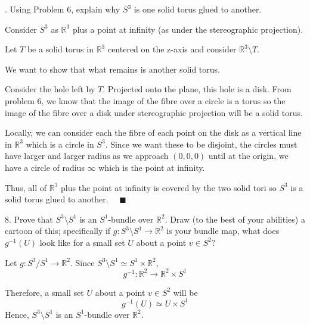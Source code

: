 \documentclass[12pt]{article}
\newcommand{\R}{\mathbb{R}}
\newcommand{\lra}{\longrightarrow}
\newcommand{\qed}{\quad \blacksquare}
\begin{document}
    \color{black}

.  Using Problem 6, explain why $S^{3}$ is one solid torus glued to another. 

    \color{blue}
        Consider $S^3$ as $\R^3$ plus a point at infinity (as under the stereographic projection). 

        Let $T$ be a solid torus in $\R^3$ centered on the z-axis and consider $\R^3 \setminus T$. 

        We want to show that what remains is another solid torus. 

        Consider the hole left by $T$. Projected onto the plane, this hole is a disk. From problem 6, we know that the image of the fibre over a circle is a torus so the image of the fibre over a disk under stereographic projection will be a solid torus. 

        Locally, we can consider each the fibre of each point on the disk as a vertical line in $\R^3$ which is a circle in $S^3$. Since we want these to be disjoint, the circles must have larger and larger radius as we approach $(0, 0, 0)$ until at the origin, we have a circle of radius $\infty$ which is the point at infinity.

        Thus, all of $\R^3$ plus the point at infinity is covered by the two solid tori so $S^3$ is a solid torus glued to another. $\qed$

    \color{black}


\pagebreak  

8.  Prove that $S^{3}\setminus S^{1}$ is an $S^{1}$-bundle over $\R^{2}$.  Draw (to the best of your abilities) a cartoon of this; specifically if $g: S^{3}\setminus S^{1} \lra \R^{2}$ is your bundle map, what does $g^{-1}(U)$ look like for a small set $U$ about a point $v \in S^{2}$? 

    \color{blue}
        Let $g: S^3/S^1 \to \R^2$. Since $S^3 \setminus S^1 \simeq S^1 \times \R^2$, 
        \[g^{-1}: \R^2 \to \R^2 \times S^1\] 

        Therefore, a small set $U$ about a point $v \in S^2$ will be 
        \[g^{-1}(U) \simeq U \times S^1\]
        Hence, $S^3 \setminus S^1$ is an $S^1$-bundle over $\R^2$.
\end{document}
